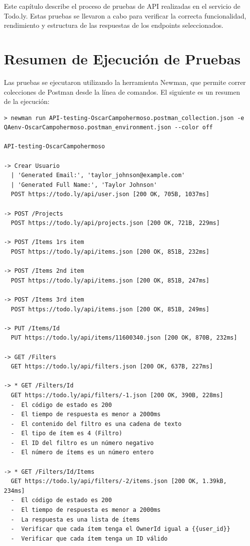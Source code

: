 \documentclass{report}
\begin{document}
Este capítulo describe el proceso de pruebas de API realizadas en el servicio de Todo.ly. Estas pruebas se llevaron a cabo para verificar la correcta funcionalidad, rendimiento y estructura de las respuestas de los endpoints seleccionados.

\section{Resumen de Ejecución de Pruebas}
Las pruebas se ejecutaron utilizando la herramienta Newman, que permite correr colecciones de Postman desde la línea de comandos. El siguiente es un resumen de la ejecución:

\begin{verbatim}
> newman run API-testing-OscarCampohermoso.postman_collection.json -e 
QAenv-OscarCampohermoso.postman_environment.json --color off

API-testing-OscarCampohermoso

-> Crear Usuario
  | 'Generated Email:', 'taylor_johnson@example.com'
  | 'Generated Full Name:', 'Taylor Johnson'
  POST https://todo.ly/api/user.json [200 OK, 705B, 1037ms]

-> POST /Projects
  POST https://todo.ly/api/projects.json [200 OK, 721B, 229ms]

-> POST /Items 1rs item
  POST https://todo.ly/api/items.json [200 OK, 851B, 232ms]

-> POST /Items 2nd item
  POST https://todo.ly/api/items.json [200 OK, 851B, 247ms]

-> POST /Items 3rd item
  POST https://todo.ly/api/items.json [200 OK, 851B, 249ms]

-> PUT /Items/Id
  PUT https://todo.ly/api/items/11600340.json [200 OK, 870B, 232ms]

-> GET /Filters
  GET https://todo.ly/api/filters.json [200 OK, 637B, 227ms]

-> * GET /Filters/Id
  GET https://todo.ly/api/filters/-1.json [200 OK, 390B, 228ms]
  -  El código de estado es 200
  -  El tiempo de respuesta es menor a 2000ms
  -  El contenido del filtro es una cadena de texto
  -  El tipo de ítem es 4 (Filtro)
  -  El ID del filtro es un número negativo
  -  El número de ítems es un número entero

-> * GET /Filters/Id/Items
  GET https://todo.ly/api/filters/-2/items.json [200 OK, 1.39kB, 234ms]
  -  El código de estado es 200
  -  El tiempo de respuesta es menor a 2000ms
  -  La respuesta es una lista de ítems
  -  Verificar que cada ítem tenga el OwnerId igual a {{user_id}}
  -  Verificar que cada ítem tenga un ID válido


\end{verbatim}
\end{document}
